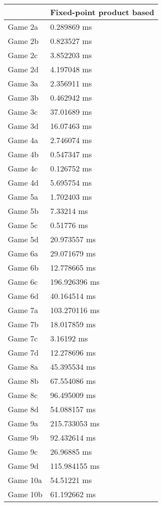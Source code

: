 \begin{tabular}{|l|l|}
	\hline
	& Fixed-point product based \\ \hline
	Game 2a & 0.289869 ms \\ \hline
	Game 2b & 0.823527 ms \\ \hline
	Game 2c & 3.852203 ms \\ \hline
	Game 2d & 4.197048 ms \\ \hline
	Game 3a & 2.356911 ms \\ \hline
	Game 3b & 0.462942 ms \\ \hline
	Game 3c & 37.01689 ms \\ \hline
	Game 3d & 16.07463 ms \\ \hline
	Game 4a & 2.746074 ms \\ \hline
	Game 4b & 0.547347 ms \\ \hline
	Game 4c & 0.126752 ms \\ \hline
	Game 4d & 5.695754 ms \\ \hline
	Game 5a & 1.702403 ms \\ \hline
	Game 5b & 7.33214 ms \\ \hline
	Game 5c & 0.51776 ms \\ \hline
	Game 5d & 20.973557 ms \\ \hline
	Game 6a & 29.071679 ms \\ \hline
	Game 6b & 12.778665 ms \\ \hline
	Game 6c & 196.926396 ms \\ \hline
	Game 6d & 40.164514 ms \\ \hline
	Game 7a & 103.270116 ms \\ \hline
	Game 7b & 18.017859 ms \\ \hline
	Game 7c & 3.16192 ms \\ \hline
	Game 7d & 12.278696 ms \\ \hline
	Game 8a & 45.395534 ms \\ \hline
	Game 8b & 67.554086 ms \\ \hline
	Game 8c & 96.495009 ms \\ \hline
	Game 8d & 54.088157 ms \\ \hline
	Game 9a & 215.733053 ms \\ \hline
	Game 9b & 92.432614 ms \\ \hline
	Game 9c & 26.96885 ms \\ \hline
	Game 9d & 115.984155 ms \\ \hline
	Game 10a & 54.51221 ms \\ \hline
	Game 10b & 61.192662 ms \\ \hline

\end{tabular}

